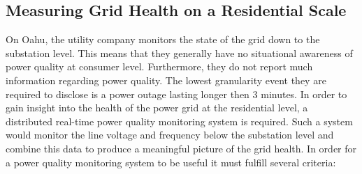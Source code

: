 \subsection{Measuring Grid Health on a Residential Scale}
On Oahu, the utility company monitors the state of the grid down to the substation level. This means that they generally have no situational awareness of power quality at consumer level. Furthermore, they do not report much information regarding power quality. The lowest granularity event they are required to disclose is a power outage lasting longer then 3 minutes. In order to gain insight into the health of the power grid at the residential level, a distributed real-time power quality monitoring system is required. Such a system would monitor the line voltage and frequency below the substation level and combine this data to produce a meaningful picture of the grid health. In order for a power quality monitoring system to be useful it must fulfill several criteria:
